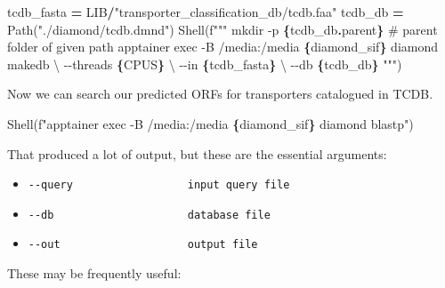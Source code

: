 \documentclass[
]{book}
\newenvironment{Shaded}{\begin{snugshade}}{\end{snugshade}}
\newcommand{\CharTok}[1]{\textcolor[rgb]{0.31,0.60,0.02}{#1}}
\newcommand{\NormalTok}[1]{#1}
\newcommand{\OperatorTok}[1]{\textcolor[rgb]{0.81,0.36,0.00}{\textbf{#1}}}
\newcommand{\SpecialCharTok}[1]{\textcolor[rgb]{0.81,0.36,0.00}{\textbf{#1}}}
\newcommand{\SpecialStringTok}[1]{\textcolor[rgb]{0.31,0.60,0.02}{#1}}
\newcommand{\StringTok}[1]{\textcolor[rgb]{0.31,0.60,0.02}{#1}}
\providecommand{\tightlist}{%
  \setlength{\itemsep}{0pt}\setlength{\parskip}{0pt}}
\begin{document}
\begin{Shaded}
\begin{Highlighting}[numbers=left,,]
\NormalTok{tcdb\_fasta }\OperatorTok{=}\NormalTok{ LIB}\OperatorTok{/}\StringTok{"transporter\_classification\_db/tcdb.faa"}
\NormalTok{tcdb\_db }\OperatorTok{=}\NormalTok{ Path(}\StringTok{"./diamond/tcdb.dmnd"}\NormalTok{)}
\NormalTok{Shell(}\SpecialStringTok{f"""}
\SpecialStringTok{mkdir {-}p }\SpecialCharTok{\{}\NormalTok{tcdb\_db}\SpecialCharTok{.}\NormalTok{parent}\SpecialCharTok{\}}\SpecialStringTok{ \# parent folder of given path}
\SpecialStringTok{apptainer exec {-}B /media:/media }\SpecialCharTok{\{}\NormalTok{diamond\_sif}\SpecialCharTok{\}}\SpecialStringTok{ diamond makedb }\CharTok{\textbackslash{}}
\SpecialStringTok{    {-}{-}threads }\SpecialCharTok{\{}\NormalTok{CPUS}\SpecialCharTok{\}}\SpecialStringTok{ }\CharTok{\textbackslash{}}
\SpecialStringTok{    {-}{-}in }\SpecialCharTok{\{}\NormalTok{tcdb\_fasta}\SpecialCharTok{\}}\SpecialStringTok{ }\CharTok{\textbackslash{}}
\SpecialStringTok{    {-}{-}db }\SpecialCharTok{\{}\NormalTok{tcdb\_db}\SpecialCharTok{\}}
\SpecialStringTok{"""}\NormalTok{)}
\end{Highlighting}
\end{Shaded}

Now we can search our predicted ORFs for transporters catalogued in TCDB.

\begin{Shaded}
\begin{Highlighting}[numbers=left,,]
\NormalTok{Shell(}\SpecialStringTok{f"apptainer exec {-}B /media:/media }\SpecialCharTok{\{}\NormalTok{diamond\_sif}\SpecialCharTok{\}}\SpecialStringTok{ diamond blastp"}\NormalTok{)}
\end{Highlighting}
\end{Shaded}

That produced a lot of output, but these are the essential arguments:

\begin{itemize}
\tightlist
\item
  \texttt{-\/-query\ \ \ \ \ \ \ \ \ \ \ \ \ \ \ \ \ \ input\ query\ file}
\item
  \texttt{-\/-db\ \ \ \ \ \ \ \ \ \ \ \ \ \ \ \ \ \ \ \ \ database\ file}
\item
  \texttt{-\/-out\ \ \ \ \ \ \ \ \ \ \ \ \ \ \ \ \ \ \ \ output\ file}
\end{itemize}

These may be frequently useful:
\end{document}
